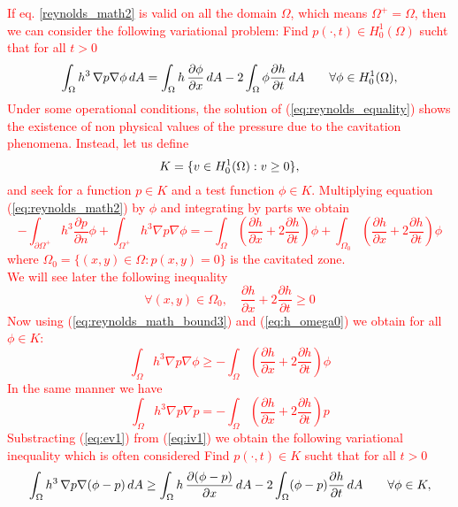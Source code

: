  \textcolor{red}{If eq. \eqref{reynolds_math2} is valid on all the domain $\Omega$, which means $\Omega^+= \Omega$, then we can consider the following variational problem: Find $p(\cdot,t) \in H^1_0(\Omega)$ sucht that for all $t >0$
\begin{equation}\label{eq:reynolds_equality}
\int_\Omega h^3\,\nabla p \nabla \phi \,dA
=\int_\Omega h\, \parder{\phi}{x}\,dA-2 \int_\Omega\phi \frac{\partial h }{\partial t}\,dA \qquad \forall \phi\in \hzerooneOm,
\end{equation}
Under some operational conditions, the solution of (\ref{eq:reynolds_equality}) shows the existence of non physical values of the pressure due to the cavitation phenomena. Instead, let us define 
\begin{equation}
K=\{v\in\hzerooneOm:v\geq 0\},\label{eq:definition_K}
\end{equation}
and seek for a function  $p\in K$ and a test function $\phi \in K$. Multiplying
equation (\ref{eq:reynolds_math2}) by $\phi$ and integrating by parts we obtain\\ 
$$
-\int_{\partial \Omega^+} h^3\dfrac{\partial p}{\partial n}\phi + \int_{\Omega^+} h^3 \nabla p \nabla \phi = -\int_{\Omega} \left(\dfrac{\partial h}{\partial x} +2 \dfrac{\partial h}{\partial t}\right)\phi+\int_{\Omega_0} \left(\dfrac{\partial h}{\partial x} +2 \dfrac{\partial h}{\partial t}\right)\phi
$$
where $\Omega_0=\{(x,y) \in \Omega:p(x,y) = 0\}$ is the cavitated zone.\\
We will see later the following inequality 
\begin{equation}\label{eq:h_omega0}
\forall (x,y) \in \Omega_0, \quad \dfrac{\partial h}{\partial x} +2 \dfrac{\partial h}{\partial t} \geq 0
\end{equation}
Now using (\ref{eq:reynolds_math_bound3}) and (\ref{eq:h_omega0}) we obtain for all $\phi \in K$:
\begin{equation} \label{eq:iv1}
\int_{\Omega} h^3 \nabla p \nabla \phi \geq  -\int_{\Omega} \left(\dfrac{\partial h}{\partial x} +2 \dfrac{\partial h}{\partial t}\right)\phi
\end{equation}
In the same manner we have
\begin{equation} \label{eq:ev1}
\int_{\Omega} h^3 \nabla p \nabla p =  -\int_{\Omega} \left(\dfrac{\partial h}{\partial x} +2 \dfrac{\partial h}{\partial t}\right)p
\end{equation}
Substracting (\ref{eq:ev1}) from (\ref{eq:iv1}) we obtain  the
following variational inequality which is often considered \cite{cimatti,stampacchia}
Find $p(\cdot,t) \in K$ sucht that for all $t >0$
\begin{equation}
\int_\Omega h^3\,\nabla p \nabla (\phi-p) \,dA
\geq\int_\Omega h\, \parder{(\phi-p)}{x}\,dA-2 \int_\Omega (\phi-p) \frac{\partial h }{\partial t}\,dA \qquad \forall \phi\in K ,\label{eq:reynolds_inequality}
\end{equation}
 }
